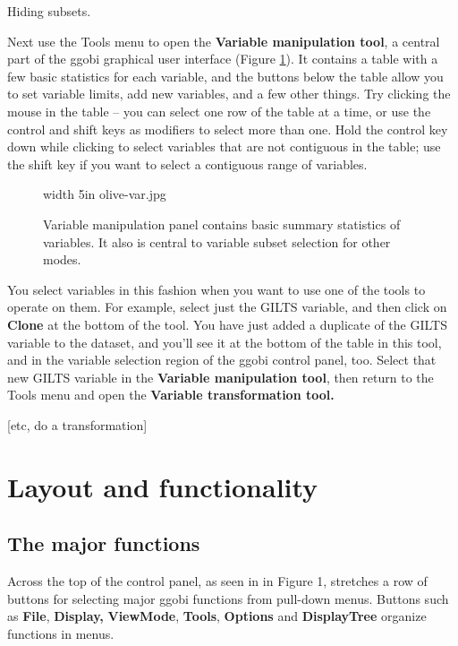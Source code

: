\documentclass[11pt]{article}
\begin{document}
Hiding subsets.

Next use the Tools menu to open the {\bf Variable manipulation tool},
a central part of the ggobi graphical user interface (Figure
\ref{fig4}).  It contains a table with a few basic statistics for each
variable, and the buttons below the table allow you to set variable
limits, add new variables, and a few other things.  Try clicking the
mouse in the table -- you can select one row of the table at a time,
or use the control and shift keys as modifiers to select more than
one.  Hold the control key down while clicking to select variables
that are not contiguous in the table; use the shift key if you want to
select a contiguous range of variables.

\begin{figure}[htp]
\vspace{-0.5in}
\pdfimage width 5in {olive-var.jpg}
\caption{Variable manipulation panel contains basic summary 
statistics of variables. It also is central to variable subset selection
for other modes.
}%
\label{fig4}
\end{figure}

You select variables in this fashion when you want to use one of
the tools to operate on them.  For example, select just the GILTS
variable, and then click on {\bf Clone} at the bottom of the tool.
You have just added a duplicate of the GILTS variable to the dataset,
and you'll see it at the bottom of the table in this tool, and in
the variable selection region of the ggobi control panel, too.
Select that new GILTS variable in the {\bf Variable manipulation tool},
then return to the Tools menu and open the {\bf Variable transformation
tool.}

[etc, do a transformation]


\section{Layout and functionality}

\subsection{The major functions}

Across the top of the control panel, as seen in in Figure 1,
stretches a row of buttons for selecting major ggobi functions from
pull-down menus.  Buttons such as {\bf File}, {\bf Display,} {\bf
ViewMode}, {\bf Tools}, {\bf Options} and {\bf DisplayTree} organize
functions in menus.
\end{document}

